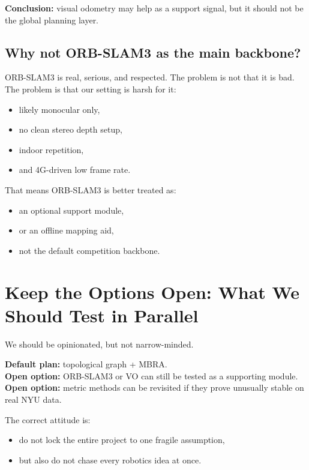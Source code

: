 \documentclass[11pt,a4paper]{article}
\begin{document}
\textbf{Conclusion:} visual odometry may help as a support signal, but it should
not be the global planning layer.

\subsection{Why not ORB-SLAM3 as the main backbone?}

ORB-SLAM3 is real, serious, and respected. The problem is not that it is bad.
The problem is that our setting is harsh for it:
\begin{itemize}[nosep]
  \item likely monocular only,
  \item no clean stereo depth setup,
  \item indoor repetition,
  \item and 4G-driven low frame rate.
\end{itemize}

That means ORB-SLAM3 is better treated as:
\begin{itemize}[nosep]
  \item an optional support module,
  \item or an offline mapping aid,
  \item not the default competition backbone.
\end{itemize}


\section{Keep the Options Open: What We Should Test in Parallel}

We should be opinionated, but not narrow-minded.

\begin{mdframed}
\textbf{Default plan:} topological graph + MBRA.\\
\textbf{Open option:} ORB-SLAM3 or VO can still be tested as a supporting module.\\
\textbf{Open option:} metric methods can be revisited if they prove unusually stable on real NYU data.
\end{mdframed}

The correct attitude is:
\begin{itemize}[nosep]
  \item do not lock the entire project to one fragile assumption,
  \item but also do not chase every robotics idea at once.
\end{itemize}
\end{document}
